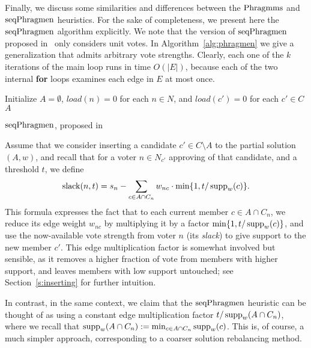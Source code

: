 Finally, we discuss some similarities and differences between the $\operatorname{Phragmms}$ and $\operatorname{seqPhragmen}$ heuristics. 
For the sake of completeness, we present here the $\operatorname{seqPhragmen}$ algorithm explicitly. 
We note that the version of $\operatorname{seqPhragmen}$ proposed in~\cite{brill2017phragmen} only considers unit votes. 
In Algorithm~\ref{alg:phragmen} we give a generalization that admits arbitrary vote strengths. 
Clearly, each one of the $k$ iterations of the main loop runs in time $O(|E|)$, because each of the two internal \textbf{for} loops examines each edge in $E$ at most once. 

\begin{algorithm}[htb]
\SetAlgoLined
{}
Initialize $A=\emptyset$, $load(n)=0$ for each $n\in N$, and $load(c')=0$ for each $c'\in C$\;
\Return $A$\;
\caption{$\operatorname{seqPhragmen}$, proposed in~\cite{brill2017phragmen}}
\label{alg:phragmen}
\end{algorithm}

Assume that we consider inserting a candidate $c'\in C\setminus A$ to the partial solution $(A,w)$, and recall that for a voter $n\in N_{c'}$ approving of that candidate, and a threshold $t$, we define 
$$\operatorname{slack}(n,t)=s_n - \sum_{c\in A\cap C_n} w_{nc} \cdot\min \{1, t/\operatorname{supp}_w(c)\}.$$ 
%
This formula expresses the fact that to each current member $c\in A\cap C_n$, we reduce its edge weight $w_{nc}$ by multiplying it by a factor $\min \{1, t/\operatorname{supp}_w(c)\}$, and use the now-available vote strength from voter $n$ (its \emph{slack}) to give support to the new member $c'$. This edge multiplication factor is somewhat involved but sensible, as it removes a higher fraction of vote from members with higher support, and leaves members with low support untouched; see Section~\ref{s:inserting} for further intuition.

In contrast, in the same context, we claim that the $\operatorname{seqPhragmen}$ heuristic can be thought of as using a constant edge multiplication factor $t/\operatorname{supp}_w(A\cap C_n)$, where we recall that $\operatorname{supp}_w(A\cap C_n):=\min_{c\in A\cap C_n} \operatorname{supp}_w(c)$. This is, of course, a much simpler approach, corresponding to a coarser solution rebalancing method. 


